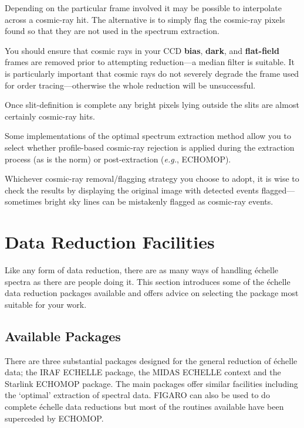\documentclass[twoside,11pt]{article}
\newcommand{\stardocinitials}  {SG}
\newcommand{\stardocnumber}    {9.2}
\newcommand{\stardocname}{\stardocinitials /\stardocnumber}
\newcommand{\htmlref}[2]{#1}
\newcommand{\xref}[3]{#1}
\newcommand{\xlabel}[1]{}
\newcommand{\sgspec}[2]{#1}
\newcommand{\sgspec}[2]{#2}
\begin{document}
Depending on the particular frame involved it may be possible to
interpolate across a cosmic-ray hit.  The alternative is to simply flag
the cosmic-ray pixels found so that they are not used in the spectrum
extraction.

You should ensure that cosmic rays in your CCD \htmlref{{\bf bias}}
{gl_bias_frame}, \htmlref{{\bf dark}}{gl_dark_frame}, and
\htmlref{{\bf flat-field}}{gl_flat_field} frames are removed prior to
attempting reduction\sgspec{---}{ - }a median filter is suitable.  It is
particularly important that cosmic rays do not severely degrade the
frame used for order tracing\sgspec{---}{ - }otherwise the whole
reduction will be unsuccessful.

Once slit-definition is complete any bright pixels lying outside the
slits are almost certainly cosmic-ray hits.

Some implementations of the optimal spectrum extraction method allow you
to select whether profile-based cosmic-ray rejection is applied
during the extraction process (as is the norm) or post-extraction
({\em{e.g.}}, \xref{ECHOMOP}{sun152}{})\@.

Whichever cosmic-ray removal/flagging strategy you choose to adopt, it
is wise to check the results by displaying the original image with
detected events flagged\sgspec{---}{ - }sometimes bright sky lines can be
mistakenly flagged as cosmic-ray events.


\section{\label{se_facilities}\xlabel{selecting_a_package}Data
         Reduction Facilities }
\markboth{Data Reduction Facilities}{\stardocname}

Like any form of data reduction, there are as many ways of handling
\'{e}chelle spectra as there are people doing it.
This section introduces some of the \'{e}chelle data reduction packages
available and offers advice on selecting the package most suitable for
your work.


\subsection{\label{se_packages}\xlabel{packages}Available Packages}

There are three substantial packages designed for the general
reduction of \'{e}chelle data; the IRAF ECHELLE package, the MIDAS
ECHELLE context and the Starlink \xref{ECHOMOP}{sun152}{} package.
The main packages offer similar facilities including the `optimal'
extraction of spectral data.
\xref{FIGARO}{sun86}{} can also be used to do complete \'{e}chelle
data reductions but most of the routines available have been superceded
by ECHOMOP.
\end{document}
